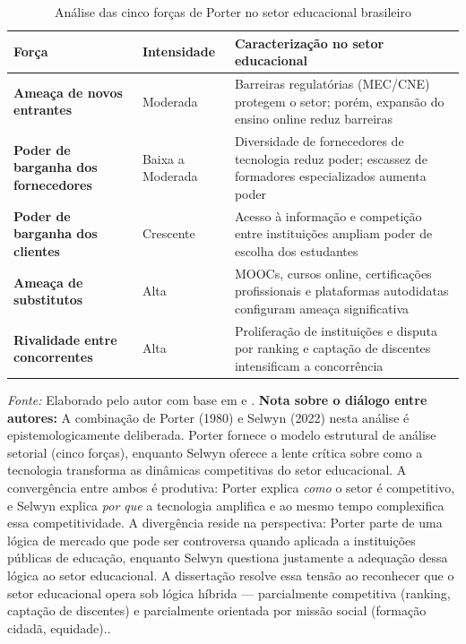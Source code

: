 \begin{table}[htbp]
    \centering
    \caption{Análise das cinco forças de Porter no setor educacional brasileiro}
    \label{tab:porter_cinco_forcas}
    \small
    \begin{tabular}{p{3.5cm} p{2cm} p{8cm}}
        \toprule
        \textbf{Força} & \textbf{Intensidade} & \textbf{Caracterização no setor educacional} \\
        \midrule
        \textbf{Ameaça de novos entrantes} & Moderada & Barreiras regulatórias (MEC/CNE) protegem o setor; porém, expansão do ensino online reduz barreiras \\
        \addlinespace
        \textbf{Poder de barganha dos fornecedores} & Baixa a Moderada & Diversidade de fornecedores de tecnologia reduz poder; escassez de formadores especializados aumenta poder \\
        \addlinespace
        \textbf{Poder de barganha dos clientes} & Crescente & Acesso à informação e competição entre instituições ampliam poder de escolha dos estudantes \\
        \addlinespace
        \textbf{Ameaça de substitutos} & Alta & MOOCs, cursos online, certificações profissionais e plataformas autodidatas configuram ameaça significativa \\
        \addlinespace
        \textbf{Rivalidade entre concorrentes} & Alta & Proliferação de instituições e disputa por ranking e captação de discentes intensificam a concorrência \\
        \bottomrule
    \end{tabular}
    \par\medskip
    \footnotesize{\textit{Fonte:} Elaborado pelo autor com base em \cite{PORTER1980} e \cite{SELWYN2022}.}
    \vspace{2pt}
    \footnotesize{\textbf{Nota sobre o diálogo entre autores:} A combinação de Porter (1980) e Selwyn (2022) nesta análise é epistemologicamente deliberada. Porter fornece o modelo estrutural de análise setorial (cinco forças), enquanto Selwyn oferece a lente crítica sobre como a tecnologia transforma as dinâmicas competitivas do setor educacional. A convergência entre ambos é produtiva: Porter explica \textit{como} o setor é competitivo, e Selwyn explica \textit{por que} a tecnologia amplifica e ao mesmo tempo complexifica essa competitividade. A divergência reside na perspectiva: Porter parte de uma lógica de mercado que pode ser controversa quando aplicada a instituições públicas de educação, enquanto Selwyn questiona justamente a adequação dessa lógica ao setor educacional. A dissertação resolve essa tensão ao reconhecer que o setor educacional opera sob lógica híbrida — parcialmente competitiva (ranking, captação de discentes) e parcialmente orientada por missão social (formação cidadã, equidade).}.
\end{table}

